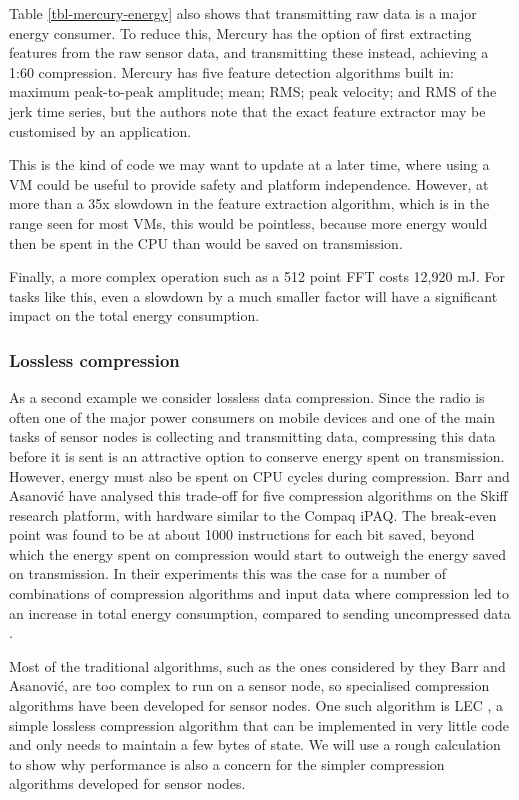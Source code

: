 Table \ref{tbl-mercury-energy} also shows that transmitting raw data is a major energy consumer. To reduce this, Mercury has the option of first extracting features from the raw sensor data, and transmitting these instead, achieving a 1:60 compression. Mercury has five feature detection algorithms built in: maximum peak-to-peak amplitude; mean; RMS; peak velocity; and RMS of the jerk time series, but the authors note that the exact feature extractor may be customised by an application.

This is the kind of code we may want to update at a later time, where using a VM could be useful to provide safety and platform independence. However, at more than a 35x slowdown in the feature extraction algorithm, which is in the range seen for most VMs, this would be pointless, because more energy would then be spent in the CPU than would be saved on transmission.

Finally, a more complex operation such as a 512 point FFT costs 12,920 mJ. For tasks like this, even a slowdown by a much smaller factor will have a significant impact on the total energy consumption.

\subsubsection{Lossless compression}
As a second example we consider lossless data compression. Since the radio is often one of the major power consumers on mobile devices and one of the main tasks of sensor nodes is collecting and transmitting data, compressing this data before it is sent is an attractive option to conserve energy spent on transmission. However, energy must also be spent on CPU cycles during compression. Barr and Asanovi\'c have analysed this trade-off for five compression algorithms on the Skiff research platform, with hardware similar to the Compaq iPAQ. The break-even point was found to be at about 1000 instructions for each bit saved, beyond which the energy spent on compression would start to outweigh the energy saved on transmission. In their experiments this was the case for a number of combinations of compression algorithms and input data where compression led to an increase in total energy consumption, compared to sending uncompressed data \cite{Barr:2006vg}.

Most of the traditional algorithms, such as the ones considered by they Barr and Asanovi\'c, are too complex to run on a sensor node, so specialised compression algorithms have been developed for sensor nodes. One such algorithm is LEC \cite{Marcelloni:2009ja}, a simple lossless compression algorithm that can be implemented in very little code and only needs to maintain a few bytes of state. We will use a rough calculation to show why performance is also a concern for the simpler compression algorithms developed for sensor nodes.


